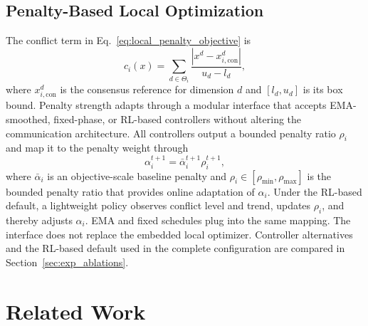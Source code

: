\documentclass[conference]{IEEEtran}
\begin{document}
\subsection{Penalty-Based Local Optimization}\label{sec:penalty_interface}
The conflict term in Eq.~\eqref{eq:local_penalty_objective} is
\begin{equation}
c_i(x)=\sum_{d\in\Theta_i}\frac{\left|x^d-x_{i,\mathrm{con}}^d\right|}{u_d-l_d},
\label{eq:conflict_term}
\end{equation}
where $x_{i,\mathrm{con}}^d$ is the consensus reference for dimension $d$ and $[l_d,u_d]$ is its box bound. Penalty strength adapts through a modular interface that accepts EMA-smoothed, fixed-phase, or RL-based controllers without altering the communication architecture. All controllers output a bounded penalty ratio $\rho_i$ and map it to the penalty weight through
\begin{equation}
\alpha_i^{t+1}=\bar{\alpha}_i^{t+1}\rho_i^{t+1},
\label{eq:alpha_mapping}
\end{equation}
where $\bar{\alpha}_i$ is an objective-scale baseline penalty and $\rho_i\in[\rho_{\min},\rho_{\max}]$ is the bounded penalty ratio that provides online adaptation of $\alpha_i$. Under the RL-based default, a lightweight policy observes conflict level and trend, updates $\rho_i$, and thereby adjusts $\alpha_i$. EMA and fixed schedules plug into the same mapping. The interface does not replace the embedded local optimizer. Controller alternatives and the RL-based default used in the complete configuration are compared in Section~\ref{sec:exp_ablations}.

\section{Related Work}\label{sec:related}
\end{document}
